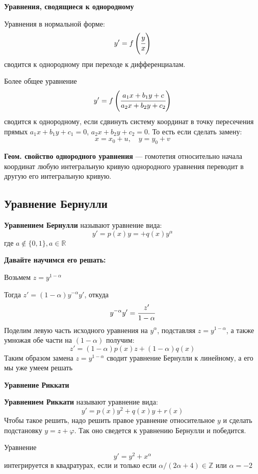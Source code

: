 \textbf{Уравнения, сводящиеся к однородному}

Уравнения в нормальной форме:
$$y' = f\left(\cfrac{y}{x}\right)$$
сводится к однородному при переходе к дифференциалам.

Более общее уравнение 
$$y' = f \left(\cfrac{a_1x + b_1 y + c}{a_2x + b_2 y + c_2}
\right)$$
сводится к однородному, если сдвинуть систему координат в точку пересечения прямых $a_1x  + b_1y + c_1 =0$, $a_2 x + b_2 y + c_2 = 0$. То есть если сделать замену:
$$x = x_0 +u, \quad y = y_0 + v$$

\textbf{Геом. свойство однородного уравнения} --- гомотетия относительно начала координат любую интегральную кривую однородного уравнения переводит в другую его интегральную кривую.

\subsection{Уравнение Бернулли}

 \textbf{Уравнением Бернулли} называют уравнение вида:
$$y' = p(x) y =+ q(x) y^{\alpha}$$
где $a \not \in \{0,1\} ,a\in \mathbb{R}$

\textbf{Давайте научимся его решать:}

Возьмем $z = y^{1-\alpha}$

Тогда $z' = (1-\alpha) y^{-\alpha}y'$, откуда
$$y^{-\alpha}y' = \cfrac{z'}{1-\alpha}$$
Поделим левую часть исходного уравнения на $y^{\alpha}$, подставляя $z = y^{1-\alpha}$, а также умножая обе части на $(1-\alpha)$ получим:
$$z' = (1-\alpha) p(x) z + (1-\alpha)q(x)$$
Таким образом замена $z = y^{1-\alpha}$ сводит уравнение Бернулли к линейному, а его мы уже умеем решать

\textbf{Уравнение Риккати}

  \textbf{Уравнением Риккати} называют уравнение вида:
$$y' = p(x) y^2 + q(x) y + r(x)$$
Чтобы такое решить, надо решить правое уравнение относительное $y$ и сделать подстановку $y =  z + \varphi$. Так оно сведется к уравнению Бернулли и победится.


Уравнение
$$y' = y^2 + x^{\alpha}$$
интегрируется в квадратурах, если и только если $\alpha / (2\alpha + 4) \in \mathbb{Z}$ или $\alpha = -2$